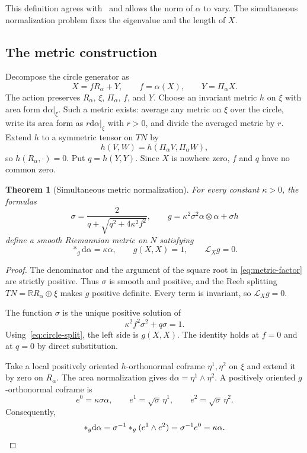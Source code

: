 \documentclass[11pt,a4paper]{article}
\numberwithin{equation}{section}
\newtheorem{theorem}{Theorem}[section]
\theoremstyle{definition}
\theoremstyle{remark}
\newcommand{\Lie}{\mathcal L}
\newcommand{\dd}{\mathrm d}
\begin{document}
This definition agrees with~\cite[Definition 2.1]{Kom} and allows the
norm of $\alpha$ to vary. The simultaneous normalization problem fixes
the eigenvalue and the length of $X$.

\subsection{The metric construction}

Decompose the circle generator as
\begin{equation}\label{eq:circle-split}
 X=fR_\alpha+Y,\qquad f=\alpha(X),\qquad Y=\Pi_\alpha X.
\end{equation}
The action preserves $R_\alpha$, $\xi$, $\Pi_\alpha$, $f$, and $Y$.
Choose an invariant metric $h$ on $\xi$ with area form
$\dd\alpha|_\xi$. Such a metric exists: average any metric on $\xi$ over
the circle, write its area form as $r\dd\alpha|_\xi$ with $r>0$, and
divide the averaged metric by $r$. Extend $h$ to a symmetric tensor on
$TN$ by
\[
 h(V,W)=h(\Pi_\alpha V,\Pi_\alpha W),
\]
so $h(R_\alpha,\cdot)=0$. Put $q=h(Y,Y)$.
Since $X$ is nowhere zero, $f$ and $q$ have no common zero.

\begin{theorem}[Simultaneous metric normalization]\label{thm:metric}
For every constant $\kappa>0$, the formulas
\begin{equation}\label{eq:metric-factor}
 \sigma=\frac{2}{q+\sqrt{q^2+4\kappa^2f^2}},\qquad
 g=\kappa^2\sigma^2\alpha\otimes\alpha+\sigma h
\end{equation}
define a smooth Riemannian metric on $N$ satisfying
\begin{equation}\label{eq:metric-identities}
 *_g\dd\alpha=\kappa\alpha,\qquad
 g(X,X)=1,\qquad \Lie_Xg=0.
\end{equation}
\end{theorem}

\begin{proof}
The denominator and the argument of the square root in
\eqref{eq:metric-factor} are strictly positive. Thus $\sigma$ is smooth
and positive, and the Reeb splitting $TN=\mathbb RR_\alpha\oplus\xi$
makes $g$ positive definite. Every term is invariant, so $\Lie_Xg=0$.

The function $\sigma$ is the unique positive solution of
\begin{equation}\label{eq:metric-quadratic}
 \kappa^2f^2\sigma^2+q\sigma=1.
\end{equation}
Using~\eqref{eq:circle-split}, the left side is $g(X,X)$.
The identity holds at $f=0$ and at $q=0$ by direct substitution.

Take a local positively oriented $h$-orthonormal coframe
$\eta^1,\eta^2$ on $\xi$ and extend it by zero on $R_\alpha$.
The area normalization gives $\dd\alpha=\eta^1\wedge\eta^2$.
A positively oriented $g$-orthonormal coframe is
\[
 e^0=\kappa\sigma\alpha,\qquad
 e^1=\sqrt\sigma\,\eta^1,\qquad
 e^2=\sqrt\sigma\,\eta^2.
\]
Consequently,
\[
 *_g\dd\alpha=\sigma^{-1}*_g(e^1\wedge e^2)
             =\sigma^{-1}e^0=\kappa\alpha.
\qedhere
\]
\end{proof}
\end{document}
